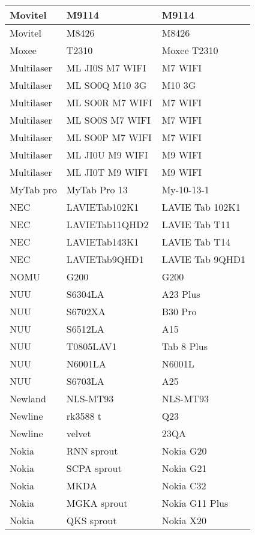 \begin{tabularx}{\linewidth}{|l|X|X|}
        Movitel & M9114 & M9114 \\ \hline
        Movitel & M8426 & M8426 \\ \hline
        Moxee & T2310 & Moxee T2310 \\ \hline
        Multilaser & ML JI0S M7 WIFI & M7 WIFI \\ \hline
        Multilaser & ML SO0Q M10 3G & M10 3G \\ \hline
        Multilaser & ML SO0R M7 WIFI & M7 WIFI \\ \hline
        Multilaser & ML SO0S M7 WIFI & M7 WIFI \\ \hline
        Multilaser & ML SO0P M7 WIFI & M7 WIFI \\ \hline
        Multilaser & ML JI0U M9 WIFI & M9 WIFI \\ \hline
        Multilaser & ML JI0T M9 WIFI & M9 WIFI \\ \hline
        MyTab pro & MyTab Pro 13 & My-10-13-1 \\ \hline
        NEC & LAVIETab102K1 & LAVIE Tab 102K1 \\ \hline
        NEC & LAVIETab11QHD2 & LAVIE Tab T11 \\ \hline
        NEC & LAVIETab143K1 & LAVIE Tab T14 \\ \hline
        NEC & LAVIETab9QHD1 & LAVIE Tab 9QHD1 \\ \hline
        NOMU & G200 & G200 \\ \hline
        NUU & S6304LA & A23 Plus \\ \hline
        NUU & S6702XA & B30 Pro \\ \hline
        NUU & S6512LA & A15 \\ \hline
        NUU & T0805LAV1 & Tab 8 Plus \\ \hline
        NUU & N6001LA & N6001L \\ \hline
        NUU & S6703LA & A25 \\ \hline
        Newland & NLS-MT93 & NLS-MT93 \\ \hline
        Newline & rk3588 t & Q23 \\ \hline
        Newline & velvet & 23QA \\ \hline
        Nokia & RNN sprout & Nokia G20 \\ \hline
        Nokia & SCPA sprout & Nokia G21 \\ \hline
        Nokia & MKDA & Nokia C32 \\ \hline
        Nokia & MGKA sprout & Nokia G11 Plus \\ \hline
        Nokia & QKS sprout & Nokia X20 \\ \hline

\end{tabularx}
